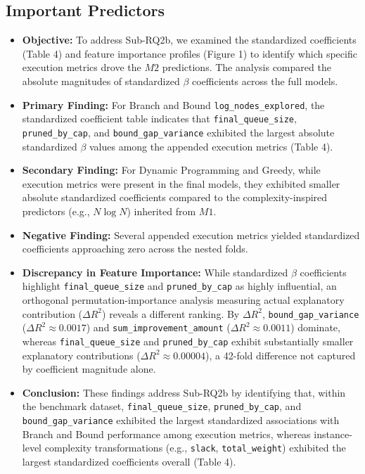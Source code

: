\documentclass[11pt,a4paper]{article}
\begin{document}
\subsection{Important Predictors}
\begin{itemize}
  \item \textbf{Objective:} To address Sub-RQ2b, we examined the standardized coefficients (Table 4) and feature importance profiles (Figure 1) to identify which specific execution metrics drove the $M2$ predictions. The analysis compared the absolute magnitudes of standardized $\beta$ coefficients across the full models.
  \item \textbf{Primary Finding:} For Branch and Bound \texttt{log\_nodes\_explored}, the standardized coefficient table indicates that \texttt{final\_queue\_size}, \texttt{pruned\_by\_cap}, and \texttt{bound\_gap\_variance} exhibited the largest absolute standardized $\beta$ values among the appended execution metrics (Table 4).
  \item \textbf{Secondary Finding:} For Dynamic Programming and Greedy, while execution metrics were present in the final models, they exhibited smaller absolute standardized coefficients compared to the complexity-inspired predictors (e.g., $N \log N$) inherited from $M1$.
  \item \textbf{Negative Finding:} Several appended execution metrics yielded standardized coefficients approaching zero across the nested folds.
  \item \textbf{Discrepancy in Feature Importance:} While standardized $\beta$ coefficients highlight \texttt{final\_queue\_size} and \texttt{pruned\_by\_cap} as highly influential, an orthogonal permutation-importance analysis measuring actual explanatory contribution ($\Delta R^2$) reveals a different ranking. By $\Delta R^2$, \texttt{bound\_gap\_variance} ($\Delta R^2 \approx 0.0017$) and \texttt{sum\_improvement\_amount} ($\Delta R^2 \approx 0.0011$) dominate, whereas \texttt{final\_queue\_size} and \texttt{pruned\_by\_cap} exhibit substantially smaller explanatory contributions ($\Delta R^2 \approx 0.00004$), a 42-fold difference not captured by coefficient magnitude alone.
  \item \textbf{Conclusion:} These findings address Sub-RQ2b by identifying that, within the benchmark dataset, \texttt{final\_queue\_size}, \texttt{pruned\_by\_cap}, and \texttt{bound\_gap\_variance} exhibited the largest standardized associations with Branch and Bound performance among execution metrics, whereas instance-level complexity transformations (e.g., \texttt{slack}, \texttt{total\_weight}) exhibited the largest standardized coefficients overall (Table 4).
\end{itemize}
\end{document}
